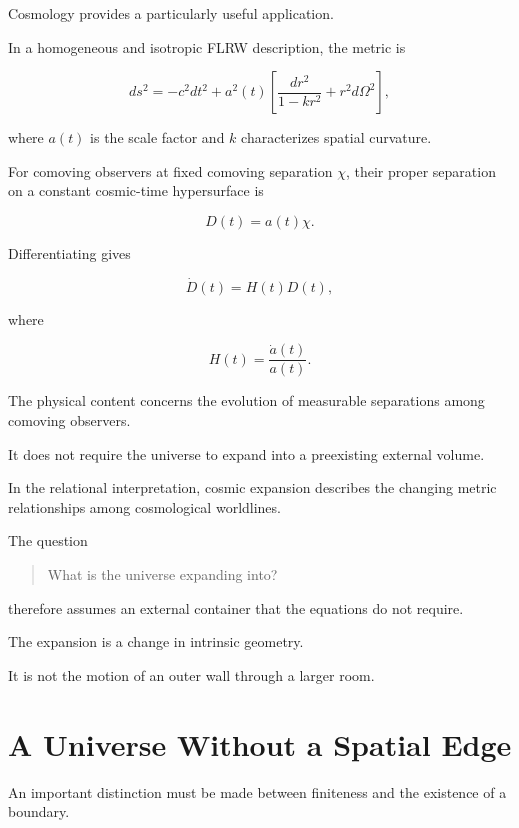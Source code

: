 \documentclass[12pt,onecolumn]{article}
\begin{document}
Cosmology provides a particularly
useful application.

In a homogeneous and isotropic
FLRW description, the metric is

\begin{equation}
ds^2
=
-c^2dt^2
+
a^2(t)
\left[
\frac{dr^2}{1-kr^2}
+
r^2d\Omega^2
\right],
\end{equation}

where $a(t)$ is the scale factor
and $k$ characterizes spatial
curvature.

For comoving observers at fixed
comoving separation $\chi$, their
proper separation on a constant
cosmic-time hypersurface is

\begin{equation}
D(t)=a(t)\chi.
\end{equation}

Differentiating gives

\begin{equation}
\dot D(t)=H(t)D(t),
\end{equation}

where

\begin{equation}
H(t)=\frac{\dot a(t)}{a(t)}.
\end{equation}

The physical content concerns the
evolution of measurable separations
among comoving observers.

It does not require the universe
to expand into a preexisting
external volume.

In the relational interpretation,
cosmic expansion describes the
changing metric relationships
among cosmological worldlines.

The question

\begin{quote}
What is the universe expanding into?
\end{quote}

therefore assumes an external
container that the equations
do not require.

The expansion is a change in
intrinsic geometry.

It is not the motion of an
outer wall through a larger room.

\section{A Universe Without a Spatial Edge}

An important distinction must be
made between finiteness and
the existence of a boundary.
\end{document}
